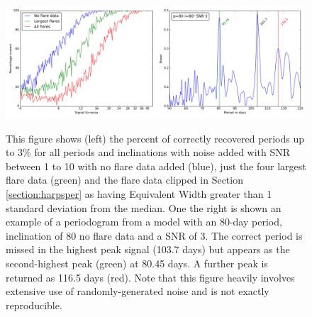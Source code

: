 \begin{figure}[!htbp]
\begin{center}
\includegraphics[scale=0.25]{Figures/missedperiod.png} \\
\end{center}
\caption{This figure shows (left) the percent of correctly recovered periods up to 3\% for all periods and inclinations
  with noise added with SNR between 1 to 10 with no flare data added (blue), just the four largest flare data (green)
  and the flare data clipped in Section \ref{section:harpsper} as having Equivalent Width greater than 1 standard
  deviation from the median. One the right is shown an example of a periodogram from a model with an 80-day period,
  inclination of 80{\degree} no flare data and a SNR of 3. The correct period is missed in the highest peak signal
  (103.7 days) but appears as the second-highest peak (green) at 80.45 days. A further peak is returned as 116.5 days
  (red). Note that this figure heavily involves extensive use of randomly-generated noise and is not exactly
  reproducible.}
\protect\label{fig:noiseresults}
\end{figure}

